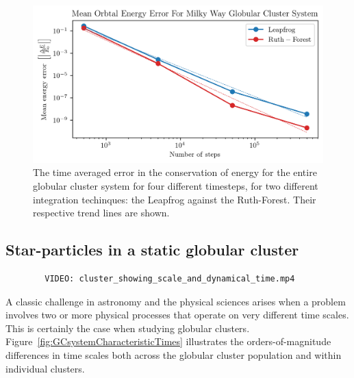         \begin{figure}
            \centering
            \includegraphics[width=\linewidth]{images/numericalErrorMeanEnergyErrorRuthForestLeapfrog.png}
            \caption{The time averaged error in the conservation of energy for the entire globular cluster system for four different timesteps, for two different integration techinques: the Leapfrog against the Ruth-Forest. Their respective trend lines are shown.}
            \label{fig:numericalErrorMeanEnergyErrorRuthForestLeapfrog}
        \end{figure}

    \subsection{Star-particles in a static globular cluster}

        \begin{verbatim}
        VIDEO: cluster_showing_scale_and_dynamical_time.mp4
        \end{verbatim}
        
        A classic challenge in astronomy and the physical sciences arises when a problem involves two or more physical processes that operate on very different time scales. This is certainly the case when studying globular clusters. Figure~\ref{fig:GCsystemCharacteristicTimes} illustrates the orders-of-magnitude differences in time scales both across the globular cluster population and within individual clusters.

